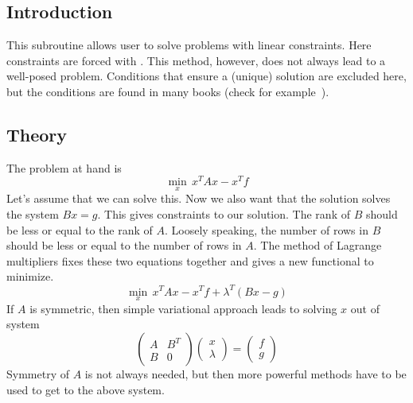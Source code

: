\chapter{}
\noindent
{}

\section{Introduction}
This subroutine allows user to solve problems with linear constraints.
Here constraints are forced with . This method,
however, does not always lead to a well-posed problem. Conditions that ensure
a (unique) solution are excluded here, but the conditions are found in many
books (check for example~\cite{c:girault}).  

\section{Theory}
The problem at hand is
\begin{equation}\label{e:problem}
\min_x \, x^T A x - x^T f
\end{equation}
Let's assume that we can solve this. Now we also want that the solution
solves the system $Bx = g$. This gives constraints to our solution.
The rank of $B$ should be less or equal to the rank of $A$.
Loosely speaking, the number of rows in $B$ should be less or equal to the
number of rows in $A$. The method of Lagrange multipliers fixes these two
equations together and gives a new functional to minimize.
\begin{equation}
\min_x \, x^T A x - x^T f +\lambda^T ( Bx-g )
\end{equation}
If $A$ is symmetric, then simple variational approach leads to solving
$x$ out of system
\begin{equation}
\begin{pmatrix}
A & B^T \\
B & 0 
\end{pmatrix} 
\begin{pmatrix}
x \\
\lambda
\end{pmatrix}
=
\begin{pmatrix}
f \\
g
\end{pmatrix}
\end{equation}
Symmetry of $A$ is not always needed, but then more powerful methods have to be used
to get to the above system.

